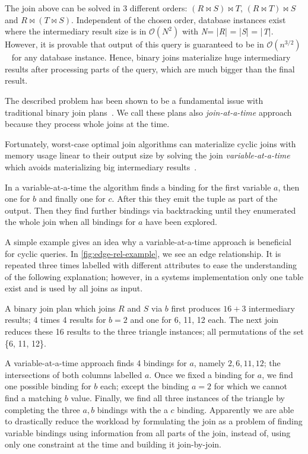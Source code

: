 The join above can be solved in 3 different orders: $ (R \bowtie S) \bowtie T$, $ (R \bowtie T) \bowtie S$ and
$ R \bowtie (T \bowtie S)$.
Independent of the chosen order, database instances exist where the intermediary result size is in $\mathcal{O}(N^2)$ with
\textit{N}= |\textit{R}| = |\textit{S}| = |\textit{T}|.
However, it is provable that output of this query is guaranteed to be in $\mathcal{O}(n^{3/2})$~\cite{agm,skew-strikes-back}
for any database instance.
Hence, binary joins materialize huge intermediary results after processing parts of the query,
which are much bigger than the final result.

The described problem has been shown to be a fundamental issue with traditional binary join plans~\cite{agm,skew-strikes-back}.
We call these plans also \textit{join-at-a-time} approach because they process whole joins at the time.

Fortunately, worst-case optimal join algorithms can materialize cyclic joins with memory usage linear to their output size
by solving the join \textit{variable-at-a-time} which avoids materializing big intermediary results~\cite{leapfrog,nprr}.

In a variable-at-a-time the algorithm finds a binding for the first variable $a$, then one for $b$ and
finally one for $c$.
After this they emit the tuple as part of the output.
Then they find further bindings via backtracking until they enumerated the whole join when all bindings for $a$ have been explored.

A simple example gives an idea why a variable-at-a-time approach is beneficial for cyclic queries.
In \cref{fig:edge-rel-example}, we see an edge relationship.
It is repeated three times labelled with different attributes to ease the understanding of the following explanation;
however, in a systems implementation only one table exist and is used by all joins as input.

A binary join plan which joins $R$ and $S$ via $b$ first produces $16 + 3$ intermediary results;
4 times 4 results for $b = 2$ and one for 6, 11, 12 each.
The next join reduces these 16 results to the three triangle instances; all permutations of the set \{6, 11, 12\}.

A variable-at-a-time approach finds 4 bindings for $a$, namely  $2, 6, 11, 12$;
the intersections of both columns labelled $a$.
Once we fixed a binding for $a$, we find one possible binding for $b$ each;
except the binding $a = 2$ for which we cannot find a matching $b$ value.
Finally, we find all three instances of the triangle by completing the three $a, b$ bindings with
the a $c$ binding.
Apparently we are able to drastically reduce the workload by formulating the join as a problem of
finding variable bindings using information from all parts of the join, instead of, using only one constraint at the time
and building it join-by-join.

